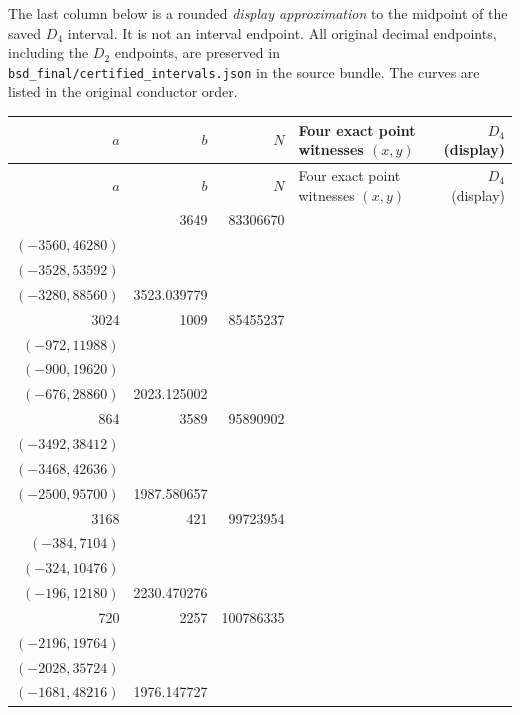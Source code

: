 \documentclass[11pt]{article}
\renewcommand{\arraystretch}{1.15}
\begin{document}
The last column below is a rounded \emph{display approximation} to the midpoint
of the saved $D_4$ interval. It is not an interval endpoint. All original decimal
endpoints, including the $D_2$ endpoints, are preserved in
\nolinkurl{bsd_final/certified_intervals.json} in the source bundle.
The curves are listed in the original conductor order.
\begingroup\footnotesize
\setlength{\tabcolsep}{4pt}
\renewcommand{\arraystretch}{1.18}
\begin{longtable}{r r r l r}
\toprule
$a$ & $b$ & $N$ & Four exact point witnesses $(x,y)$ & $D_4$ (display)\\
\midrule\endfirsthead
\toprule
$a$ & $b$ & $N$ & Four exact point witnesses $(x,y)$ & $D_4$ (display)\\
\midrule\endhead
\bottomrule\endfoot
3200 & 3649 & 83306670 & \begin{tabular}[t]{@{}l@{}}$(-3645,9990)$\\$(-3560,46280)$\\$(-3528,53592)$\\$(-3280,88560)$\end{tabular} & 3523.039779\\[5pt]
3024 & 1009 & 85455237 & \begin{tabular}[t]{@{}l@{}}$(-1008,2016)$\\$(-972,11988)$\\$(-900,19620)$\\$(-676,28860)$\end{tabular} & 2023.125002\\[5pt]
864 & 3589 & 95890902 & \begin{tabular}[t]{@{}l@{}}$(-3528,30744)$\\$(-3492,38412)$\\$(-3468,42636)$\\$(-2500,95700)$\end{tabular} & 1987.580657\\[5pt]
3168 & 421 & 99723954 & \begin{tabular}[t]{@{}l@{}}$(-396,5940)$\\$(-384,7104)$\\$(-324,10476)$\\$(-196,12180)$\end{tabular} & 2230.470276\\[5pt]
720 & 2257 & 100786335 & \begin{tabular}[t]{@{}l@{}}$(-2220,15540)$\\$(-2196,19764)$\\$(-2028,35724)$\\$(-1681,48216)$\end{tabular} & 1976.147727\\[5pt]

\end{longtable}
\end{document}
